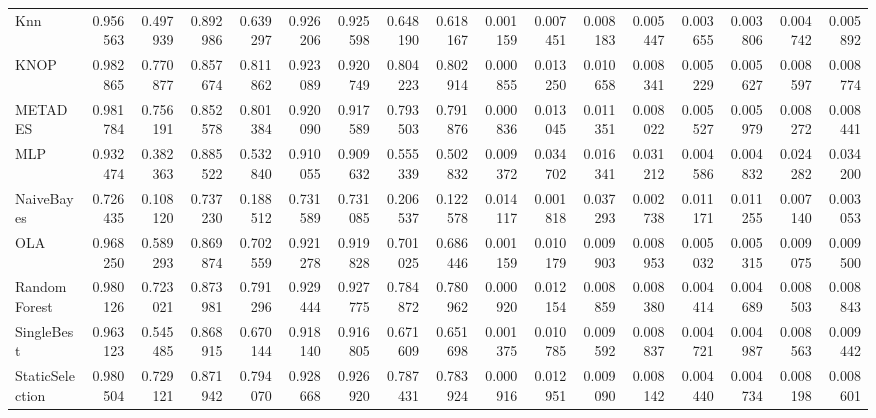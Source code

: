 \begin{tabular}{lrrrrrrrrrrrrrrrr}
Knn & 0.956563 & 0.497939 & 0.892986 & 0.639297 & 0.926206 & 0.925598 & 0.648190 & 0.618167 & 0.001159 & 0.007451 & 0.008183 & 0.005447 & 0.003655 & 0.003806 & 0.004742 & 0.005892 \\
KNOP & 0.982865 & 0.770877 & 0.857674 & 0.811862 & 0.923089 & 0.920749 & 0.804223 & 0.802914 & 0.000855 & 0.013250 & 0.010658 & 0.008341 & 0.005229 & 0.005627 & 0.008597 & 0.008774 \\
METADES & 0.981784 & 0.756191 & 0.852578 & 0.801384 & 0.920090 & 0.917589 & 0.793503 & 0.791876 & 0.000836 & 0.013045 & 0.011351 & 0.008022 & 0.005527 & 0.005979 & 0.008272 & 0.008441 \\
MLP & 0.932474 & 0.382363 & 0.885522 & 0.532840 & 0.910055 & 0.909632 & 0.555339 & 0.502832 & 0.009372 & 0.034702 & 0.016341 & 0.031212 & 0.004586 & 0.004832 & 0.024282 & 0.034200 \\
NaiveBayes & 0.726435 & 0.108120 & 0.737230 & 0.188512 & 0.731589 & 0.731085 & 0.206537 & 0.122578 & 0.014117 & 0.001818 & 0.037293 & 0.002738 & 0.011171 & 0.011255 & 0.007140 & 0.003053 \\
OLA & 0.968250 & 0.589293 & 0.869874 & 0.702559 & 0.921278 & 0.919828 & 0.701025 & 0.686446 & 0.001159 & 0.010179 & 0.009903 & 0.008953 & 0.005032 & 0.005315 & 0.009075 & 0.009500 \\
RandomForest & 0.980126 & 0.723021 & 0.873981 & 0.791296 & 0.929444 & 0.927775 & 0.784872 & 0.780962 & 0.000920 & 0.012154 & 0.008859 & 0.008380 & 0.004414 & 0.004689 & 0.008503 & 0.008843 \\
SingleBest & 0.963123 & 0.545485 & 0.868915 & 0.670144 & 0.918140 & 0.916805 & 0.671609 & 0.651698 & 0.001375 & 0.010785 & 0.009592 & 0.008837 & 0.004721 & 0.004987 & 0.008563 & 0.009442 \\
StaticSelection & 0.980504 & 0.729121 & 0.871942 & 0.794070 & 0.928668 & 0.926920 & 0.787431 & 0.783924 & 0.000916 & 0.012951 & 0.009090 & 0.008142 & 0.004440 & 0.004734 & 0.008198 & 0.008601 \\
\bottomrule
\end{tabular}
